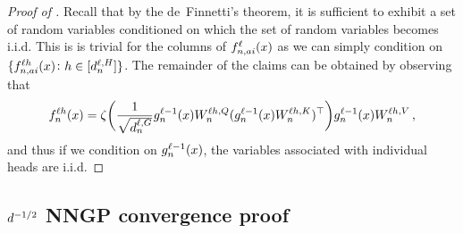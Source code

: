 \begin{proof}[Proof of ]
    Recall that by the de~Finnetti's theorem, it is sufficient to exhibit a set of random variables conditioned on which the set of random variables becomes i.i.d.
    This is is trivial for the columns of ${f}^{\ell}_{n, a i}{(x)}$ as we can simply condition on $\{ {f}^{\ell h}_{n, a i}{(x)} \colon h \in [d_{n}^{\ell, H}] \}$.
    The remainder of the claims can be obtained by observing that
    \begin{equation*}
        {f}^{\ell h}_{n}{(x)}
        =
        \zeta \biggl(
            \frac{1}{\sqrt{d_{n}^{\ell, G}}}
            {g}^{\ell - 1}_{n}{(x)}
            W_{n}^{\ell h, Q}
            ({g}^{\ell - 1}_{n}{(x)} W_{n}^{\ell h, K})^\top
        \biggr)
        {g}^{\ell - 1}_{n}{(x)}
        W_{n}^{\ell h, V}
    \, ,
    \end{equation*}
    and thus if we condition on ${g}^{\ell - 1}_{n}{(x)}$, the variables associated with individual heads are i.i.d.
\end{proof}





\subsection{$d^{-1/2}$ NNGP convergence proof}\label{sect:nngp_proofs}

\nngpConvergence*

